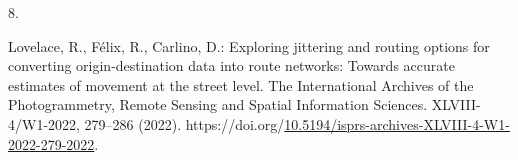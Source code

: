 \documentclass[runningheads]{llncs}
\newlength{\cslhangindent}
\newlength{\csllabelwidth}
\newlength{\cslentryspacingunit} %
\newenvironment{CSLReferences}[2] %
 {%
  \setlength{\parindent}{0pt}
  \ifodd #1
  \let\oldpar\par
  \def\par{\hangindent=\cslhangindent\oldpar}
  \fi
  \setlength{\parskip}{#2\cslentryspacingunit}
 }%
 {}
\newcommand{\CSLLeftMargin}[1]{\parbox[t]{\csllabelwidth}{#1}}
\newcommand{\CSLRightInline}[1]{\parbox[t]{\linewidth - \csllabelwidth}{#1}\break}
\begin{document}
\begin{CSLReferences}{0}{0}
\leavevmode{}%
\CSLLeftMargin{8. }%
\CSLRightInline{Lovelace, R., Félix, R., Carlino, D.: Exploring
jittering and routing options for converting origin-destination data
into route networks: Towards accurate estimates of movement at the
street level. The International Archives of the Photogrammetry, Remote
Sensing and Spatial Information Sciences. XLVIII-4/W1-2022, 279--286
(2022).
https://doi.org/\href{https://doi.org/10.5194/isprs-archives-XLVIII-4-W1-2022-279-2022}{10.5194/isprs-archives-XLVIII-4-W1-2022-279-2022}.}

\end{CSLReferences}

%
\end{document}
